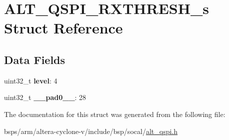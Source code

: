 \hypertarget{structALT__QSPI__RXTHRESH__s}{}\section{A\+L\+T\+\_\+\+Q\+S\+P\+I\+\_\+\+R\+X\+T\+H\+R\+E\+S\+H\+\_\+s Struct Reference}
\label{structALT__QSPI__RXTHRESH__s}
\subsection*{Data Fields}
\begin{DoxyCompactItemize}
\item 
\mbox{\label{structALT__QSPI__RXTHRESH__s_adb0b038a8dc17dae20eb672b5d4c7f06}} 
uint32\+\_\+t {\bfseries level}\+: 4
\item 
\mbox{\label{structALT__QSPI__RXTHRESH__s_a1d8e5919721b92c6e8664009b87e40a9}} 
uint32\+\_\+t {\bfseries \+\_\+\+\_\+pad0\+\_\+\+\_\+}\+: 28
\end{DoxyCompactItemize}


The documentation for this struct was generated from the following file\+:\begin{DoxyCompactItemize}
\item 
bsps/arm/altera-\/cyclone-\/v/include/bsp/socal/\mbox{\hyperlink{include_2bsp_2socal_2alt__qspi_8h}{alt\+\_\+qspi.\+h}}\end{DoxyCompactItemize}
